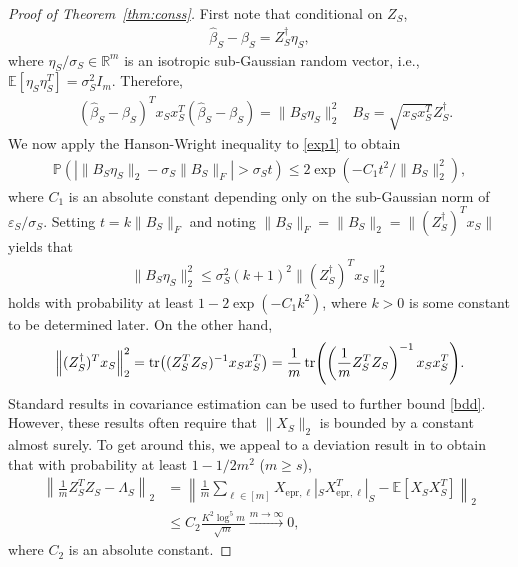 \documentclass[a4paper,11pt]{article}
\numberwithin{equation}{section}
\theoremstyle{plain}
\theoremstyle{definition}
\def\R{{\mathbb R}}
\def\E{{\mathbb E}}
\def\R{{\mathbb R}}
\def\P{{\mathbb P}}
\def\e{{\varepsilon}}
\def\ex{{\text{epr}}}
\begin{document}
\begin{proof}[Proof of Theorem~\ref{thm:conss}]
First note that conditional on $Z_S$,  
\begin{align}
\widehat{\beta}_S - \beta_S =  Z_S^\dagger\eta_S,\label{pt}
\end{align}
where $\eta_S/\sigma_S\in\R^m$ is an isotropic sub-Gaussian random vector, i.e., $\E[\eta_S\eta_S^T] = \sigma_S^2I_m$. Therefore,
\begin{align}
&(\widehat{\beta}_S-\beta_S)^Tx_Sx_S^T(\widehat{\beta}_S-\beta_S) = \|B_S\eta_S\|_2^2&B_S = \sqrt{x_Sx_S^T}Z_S^\dagger.\label{exp1}
\end{align}
We now apply the Hanson-Wright inequality \cite[Theorem 6.3.2]{Vershynin_2018} to \eqref{exp1} to obtain 
\begin{align}
\P\left(\left|\|B_S\eta_S\|_2-\sigma_S\|B_S\|_F\right|>\sigma_St\right)\leq 2\exp(-C_1t^2/\|B_S\|_2^2),\label{lalala}
\end{align}
where $C_1$ is an absolute constant depending only on the sub-Gaussian norm of $\e_S/\sigma_S$.  
Setting $t=k\|B_S\|_F$ and noting $\|B_S\|_F = \|B_S\|_2= \|(Z_S^\dagger)^T x_S\|$ yields that 
\begin{align}
\|B_S\eta_S\|_2^2\leq \sigma^2_S(k+1)^2\|(Z_S^\dagger)^T x_S\|_2^2\label{oi}
\end{align}
holds with probability at least $1-2\exp(-C_1k^2)$, where $k>0$ is some constant to be determined later. 
On the other hand, 
\begin{align}
\left\|(Z_S^\dagger)^T x_S\right\|_2^2 = \tr((Z_S^TZ_S)^{-1} x_Sx_S^T) = \frac{1}{m}\tr(\left(\frac{1}{m}Z_S^TZ_S\right)^{-1} x_Sx_S^T).\label{bdd}
\end{align}
Standard results in covariance estimation \cite[Exercise 5.6.4]{Vershynin_2018} can be used to further bound \eqref{bdd}. However, these results often require that $\|X_S\|_2$ is bounded by a constant almost surely.  To get around this, we appeal to a deviation result in \cite[Theorem 2.1]{Mendelson_2006} to obtain that with probability at least $1-1/2m^2$ ($m\geq s$), 
\begin{align}
\left\|\frac{1}{m}Z_S^TZ_S -\Lambda_S\right\|_2 &= \left\|\frac{1}{m}\sum_{\ell\in [m]}X_{\ex,\ell}|_SX^T_{\ex,\ell}|_S -\E[X_SX_S^T]\right\|_2\nonumber\\
&\leq C_2\frac{K^2\log^5 m}{\sqrt{m}}\xrightarrow{m\rightarrow\infty} 0 ,\label{cov}
\end{align}
where $C_2$ is an absolute constant. 

\end{proof}
\end{document}
